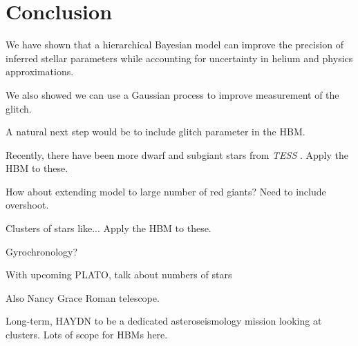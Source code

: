 %
%
%
%
%
\chapter{Conclusion}

We have shown that a hierarchical Bayesian model can improve the precision of inferred stellar parameters while accounting for uncertainty in helium and physics approximations.

We also showed we can use a Gaussian process to improve measurement of the glitch.

A natural next step would be to include glitch parameter in the HBM.

Recently, there have been more dwarf and subgiant stars from \emph{TESS} \citep{Hatt.Nielsen.ea2023}. Apply the HBM to these.

How about extending model to large number of red giants? Need to include overshoot.

Clusters of stars like... Apply the HBM to these.

Gyrochronology?

With upcoming PLATO, talk about numbers of stars

Also Nancy Grace Roman telescope.

Long-term, HAYDN to be a dedicated asteroseismology mission looking at clusters. Lots of scope for HBMs here.
